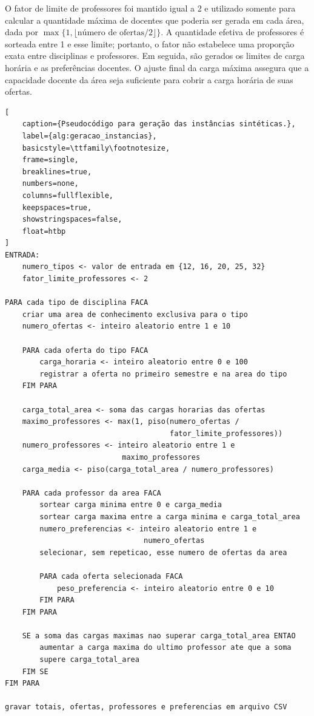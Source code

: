 O fator de limite de professores foi mantido igual a 2 e utilizado somente para calcular a quantidade máxima de docentes que poderia ser gerada em cada área, dada por $\max\{1,\lfloor\text{número de ofertas}/2\rfloor\}$. A quantidade efetiva de professores é sorteada entre 1 e esse limite; portanto, o fator não estabelece uma proporção exata entre disciplinas e professores. Em seguida, são gerados os limites de carga horária e as preferências docentes. O ajuste final da carga máxima assegura que a capacidade docente da área seja suficiente para cobrir a carga horária de suas ofertas.

\begingroup
\renewcommand{\lstlistingname}{Algoritmo}
\begin{lstlisting}[
    caption={Pseudocódigo para geração das instâncias sintéticas.},
    label={alg:geracao_instancias},
    basicstyle=\ttfamily\footnotesize,
    frame=single,
    breaklines=true,
    numbers=none,
    columns=fullflexible,
    keepspaces=true,
    showstringspaces=false,
    float=htbp
]
ENTRADA:
    numero_tipos <- valor de entrada em {12, 16, 20, 25, 32}
    fator_limite_professores <- 2

PARA cada tipo de disciplina FACA
    criar uma area de conhecimento exclusiva para o tipo
    numero_ofertas <- inteiro aleatorio entre 1 e 10

    PARA cada oferta do tipo FACA
        carga_horaria <- inteiro aleatorio entre 0 e 100
        registrar a oferta no primeiro semestre e na area do tipo
    FIM PARA

    carga_total_area <- soma das cargas horarias das ofertas
    maximo_professores <- max(1, piso(numero_ofertas /
                                      fator_limite_professores))
    numero_professores <- inteiro aleatorio entre 1 e
                           maximo_professores
    carga_media <- piso(carga_total_area / numero_professores)

    PARA cada professor da area FACA
        sortear carga minima entre 0 e carga_media
        sortear carga maxima entre a carga minima e carga_total_area
        numero_preferencias <- inteiro aleatorio entre 1 e
                                numero_ofertas
        selecionar, sem repeticao, esse numero de ofertas da area

        PARA cada oferta selecionada FACA
            peso_preferencia <- inteiro aleatorio entre 0 e 10
        FIM PARA
    FIM PARA

    SE a soma das cargas maximas nao superar carga_total_area ENTAO
        aumentar a carga maxima do ultimo professor ate que a soma
        supere carga_total_area
    FIM SE
FIM PARA

gravar totais, ofertas, professores e preferencias em arquivo CSV
\end{lstlisting}
\endgroup

